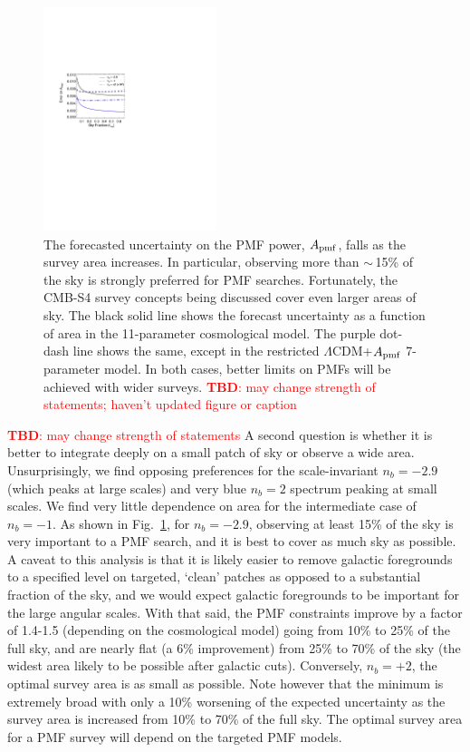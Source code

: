 \documentclass[apj]{emulateapj}
\newcommand{\apmf}{\ensuremath{A_{\rm pmf}}}
\newcommand{\lcdm}{\ensuremath{\Lambda}CDM}
\newcommand{\tbd}[1]{\textcolor{Red}{{\bf TBD}: #1}}
\begin{document}
\begin{figure}[htb]\centering
\includegraphics[width=0.45\textwidth,clip,trim={1.5cm 12.5cm 11cm 7.5cm}]{pmf_area.pdf}
  \caption[Area dependence]{
  The forecasted uncertainty on the PMF power, \apmf{}, falls as the survey area increases. 
  In particular, observing more than $\sim$\,15\% of the sky is strongly preferred for PMF searches. 
  Fortunately, the CMB-S4 survey concepts being discussed cover even larger areas of sky. 
  The black solid line shows the forecast uncertainty as a function of area in the 11-parameter cosmological model.
  The purple dot-dash line shows the same, except in the restricted \lcdm{}+\apmf{} 7-parameter model. 
  In both cases, better limits on PMFs will be achieved with wider surveys.
  \tbd{may change strength of statements; haven't updated figure or caption}
    \label{fig:area}
  }
\end{figure}

\tbd{may change strength of statements}
A second question is whether it is better to integrate deeply on a small patch of sky or observe a wide area. 
Unsurprisingly, we find opposing preferences for the scale-invariant $n_b=-2.9$ (which peaks at large scales) and very blue $n_b=2$ spectrum peaking at small scales. 
We find very little dependence on area for the intermediate case of $n_b=-1$. 
As shown in  Fig.~\ref{fig:area}, for $n_b=-2.9$, observing at least 15\% of the sky is very important to a PMF search, and it is best  to cover as much sky as possible. 
A caveat to this analysis is that it is likely easier to remove galactic foregrounds to a specified level on targeted, `clean' patches as opposed to a substantial fraction of the sky, and we would expect galactic foregrounds to be important for the large angular scales. 
With that said, the PMF constraints improve by a factor of 1.4-1.5 (depending on the cosmological model) going from 10\% to 25\% of the full sky, and are nearly flat (a 6\% improvement) from 25\% to 70\% of the sky (the widest area likely to be possible after galactic cuts).
Conversely, $n_b=+2$, the optimal survey area is as small as possible. 
Note however that the minimum is extremely broad with only a 10\% worsening of the expected uncertainty as the survey area is increased from 10\% to 70\% of the  full sky. 
The optimal survey area for a PMF survey will depend on the targeted PMF models. 
\end{document}
